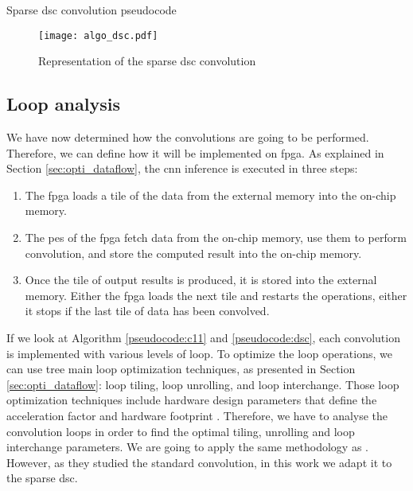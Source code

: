 \begin{enumerate}
\begin{algorithm}
\begin{algorithmic}
                        \EndFor
                    \EndFor
                \EndFor
            \EndFor
        \end{algorithmic}
        \caption{Sparse \acrshort{dsc} convolution pseudocode}
        \label{pseudocode:dsc}
    \end{algorithm}
    \begin{figure}
        \centering
        \texttt{[image: algo\_dsc.pdf]}
        \caption{Representation of the sparse \acrshort{dsc} convolution}
        \label{fig:algo_dsc}
    \end{figure}
\end{enumerate}
%
\subsection{Loop analysis}
%
We have now determined how the convolutions are going to be performed. Therefore, we can define how it will be implemented on \acrshort{fpga}. As explained in Section \ref{sec:opti_dataflow}, the \acrshort{cnn} inference is executed in three steps:
%
\begin{enumerate}
    \item The \acrshort{fpga} loads a tile of the data from the external memory into the on-chip memory.
    \item The \acrshort{pe}s of the \acrshort{fpga} fetch data from the on-chip memory, use them to perform convolution, and store the computed result into the on-chip memory.
    \item Once the tile of output results is produced, it is stored into the external memory. Either the \acrshort{fpga} loads the next tile and restarts the operations, either it stops if the last tile of data has been convolved.
\end{enumerate}
%
If we look at Algorithm \ref{pseudocode:c11} and \ref{pseudocode:dsc}, each convolution is implemented with various levels of loop. To optimize the loop operations, we can use tree main loop optimization techniques, as presented in Section \ref{sec:opti_dataflow}: loop tiling, loop unrolling, and loop interchange. Those loop optimization techniques include hardware design parameters that define the acceleration factor and hardware footprint \cite{ma_optimizing_2018}. Therefore, we have to analyse the convolution loops in order to find the optimal tiling, unrolling and loop interchange parameters. We are going to apply the same methodology as \textcite{ma_optimizing_2018}. However, as they studied the standard convolution, in this work we adapt it to the sparse \acrshort{dsc}.\cite{ma_optimizing_2018}

